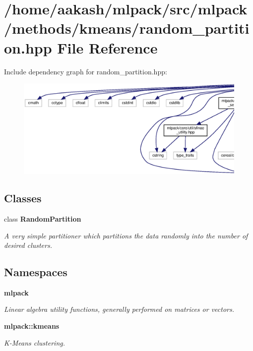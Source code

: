 \section{/home/aakash/mlpack/src/mlpack/methods/kmeans/random\+\_\+partition.hpp File Reference}
\label{random__partition_8hpp}
Include dependency graph for random\+\_\+partition.\+hpp\+:
\nopagebreak
\begin{figure}[H]
\begin{center}
\leavevmode
\includegraphics[width=350pt]{random__partition_8hpp__incl}
\end{center}
\end{figure}
\subsection*{Classes}
\begin{DoxyCompactItemize}
\item 
class \textbf{ Random\+Partition}
\begin{DoxyCompactList}\small\item\em A very simple partitioner which partitions the data randomly into the number of desired clusters. \end{DoxyCompactList}\end{DoxyCompactItemize}
\subsection*{Namespaces}
\begin{DoxyCompactItemize}
\item 
 \textbf{ mlpack}
\begin{DoxyCompactList}\small\item\em Linear algebra utility functions, generally performed on matrices or vectors. \end{DoxyCompactList}\item 
 \textbf{ mlpack\+::kmeans}
\begin{DoxyCompactList}\small\item\em K-\/\+Means clustering. \end{DoxyCompactList}\end{DoxyCompactItemize}


